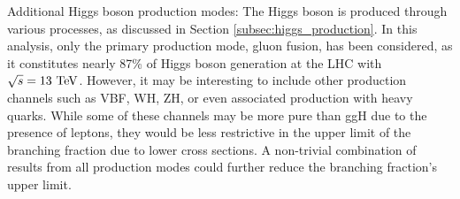 \begin{myitemlist}
    \item[Additional Higgs boson production modes:] The Higgs boson is produced through various processes, as discussed in Section \ref{subsec:higgs_production}. In this analysis, only the primary production mode, gluon fusion, has been considered, as it constitutes nearly 87\% of Higgs boson generation at the LHC with $\sqrt{s} = 13\ \text{TeV}$. However, it may be interesting to include other production channels such as VBF, WH, ZH, or even associated production with heavy quarks. While some of these channels may be more pure than ggH due to the presence of leptons, they would be less restrictive in the upper limit of the branching fraction due to lower cross sections. A non-trivial combination of results from all production modes could further reduce the branching fraction's upper limit.
\end{myitemlist}


